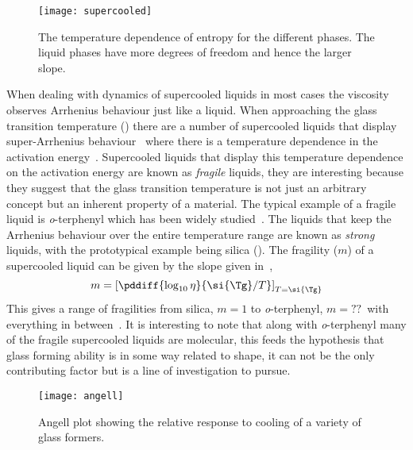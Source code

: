 \begin{figure}
    \centering
    \texttt{[image: supercooled]}
    \caption[Temperature dependence of entropy for condensed phases]{The temperature dependence of entropy for the different phases. The liquid phases have more degrees of freedom and hence the larger slope.}
    \label{fig:entropy}
\end{figure}


When dealing with dynamics of supercooled liquids in most cases the viscosity observes Arrhenius behaviour just like a liquid. When approaching the glass transition temperature (\si{\Tg}) there are a number of supercooled liquids that display super-Arrhenius behaviour~ where there is a temperature dependence in the activation energy~\cite{angell:91}. Supercooled liquids that display this temperature dependence on the activation energy are known as \emph{fragile} liquids, they are interesting because they suggest that the glass transition temperature is not just an arbitrary concept but an inherent property of a material. The typical example of a fragile liquid is \emph{o}-terphenyl which has been widely studied~\cite{greet:67}. The liquids that keep the Arrhenius behaviour over the entire temperature range are known as \emph{strong} liquids, with the prototypical example being silica (). The fragility ($m$) of a supercooled liquid can be given by the slope given in~,
\begin{equation}
    m = \left [ \pddiff{\log_{10} \eta}{\si{\Tg}/T} \right ]_{T=\si{\Tg}}
\end{equation}
This gives a range of fragilities from silica, $m = 1$ to \emph{o}-terphenyl, $m = ??$~\tocheck with everything in between~. It is interesting to note that along with \emph{o}-terphenyl many of the fragile supercooled liquids are molecular, this feeds the hypothesis that glass forming ability is in some way related to shape, it can not be the only contributing factor but is a line of investigation to pursue.

\begin{figure}
    \centering
    \texttt{[image: angell]}
    \caption{Angell plot showing the relative response to cooling of a variety of glass formers.}
    \label{fig:angell}
\end{figure}

